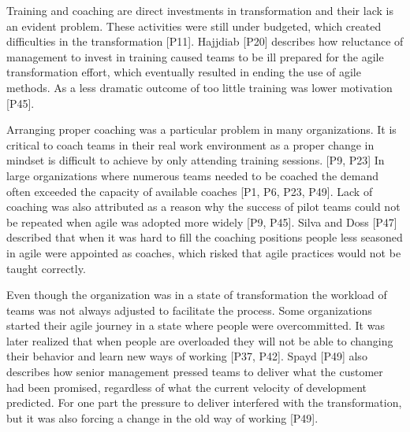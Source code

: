 \documentclass[preprint,authoryear,12pt]{elsarticle}
\begin{document}

Training and coaching are direct investments in transformation and their lack is
an evident problem. These activities were still under budgeted, which
created difficulties in the transformation [P11].
Hajjdiab [P20] describes how reluctance of management to invest in training
caused teams to be ill prepared for the agile transformation effort, which
eventually resulted in ending the use of agile methods. As a less dramatic
outcome of too little training was lower motivation [P45].

Arranging proper coaching was a particular problem in many organizations. It is
critical to coach teams in their real work environment as a proper change in
mindset is difficult to achieve by only attending training sessions. [P9, P23]
In large
organizations where numerous teams needed to be coached the demand often
exceeded the capacity of available coaches [P1, P6, P23, P49]. Lack of coaching
was also attributed as a reason why the success of pilot teams could not be
repeated when agile was adopted more widely [P9, P45].
Silva and Doss [P47] described that when it was hard to fill the coaching
positions people less seasoned in agile were appointed as coaches, which risked
that agile practices would not be taught correctly.




Even though the organization was in a state of transformation the workload of
teams was not always adjusted to facilitate the process.
Some organizations started their agile journey in a state where people were
overcommitted. It was later realized that when people are overloaded they will
not be able to changing their behavior and learn new ways of working [P37, P42].
Spayd [P49] also describes how senior management pressed teams to deliver what
the customer had been promised, regardless of what the current velocity of
development predicted. For one part the pressure to deliver interfered with the
transformation, but it was also forcing a change in the old way of working
[P49].
\end{document}
